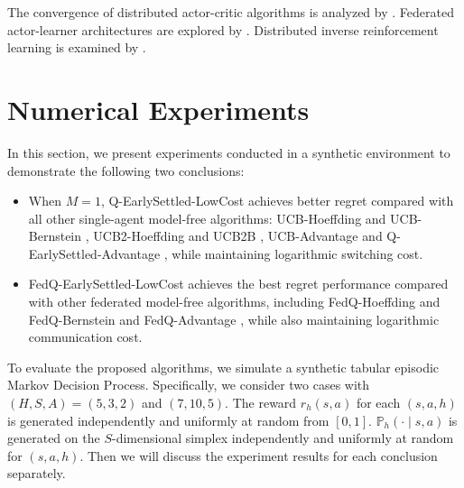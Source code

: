 \documentclass{article}
\begin{document}
The convergence of distributed actor-critic algorithms is analyzed by \cite{chen2022sample,shen2023towards}. Federated actor-learner architectures are explored by \cite{assran2019gossip,espeholt2018impala,mnih2016asynchronous}. Distributed inverse reinforcement learning is examined by \cite{banerjee2021identity, gong2023federated, liu2022distributed, liu2023meta, liu2024learning, liutrajectory, liu2025utility}.

\section{Numerical Experiments}
\label{numerical}
In this section, we present experiments conducted in a synthetic environment to demonstrate the following two conclusions:
\begin{itemize}
    \item When $M=1$, Q-EarlySettled-LowCost achieves better regret compared with all other single-agent model-free algorithms: UCB-Hoeffding and UCB-Bernstein \citep{jin2018q}, UCB2-Hoeffding and UCB2B \cite{bai2019provably}, UCB-Advantage \cite{zhang2020almost} and Q-EarlySettled-Advantage \cite{li2023breaking}, while maintaining logarithmic switching cost.
    \item FedQ-EarlySettled-LowCost achieves the best regret performance compared with other federated model-free algorithms, including FedQ-Hoeffding and FedQ-Bernstein\cite{zheng2023federated} and FedQ-Advantage \cite{zheng2024federated}, while also maintaining logarithmic communication cost.
\end{itemize}
To evaluate the proposed algorithms, we simulate a synthetic tabular episodic Markov Decision Process. Specifically, we consider two cases with $(H,S,A) = (5,3,2)$ and $(7,10,5)$. The reward $r_h(s, a)$ for each $(s,a,h)$ is generated independently and uniformly at random from $[0,1]$. $\mathbb{P}_h(\cdot \mid s, a)$ is generated on the $S$-dimensional simplex independently and uniformly at random for $(s,a,h)$. Then we will discuss the experiment results for each conclusion separately. 
\end{document}
